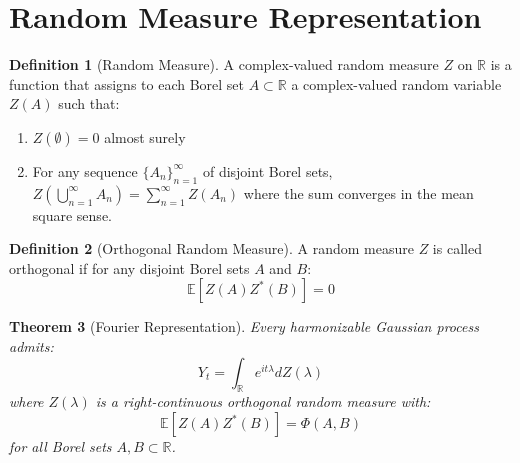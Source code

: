 \documentclass{article}
\theoremstyle{plain}
\newtheorem{theorem}{Theorem}
\theoremstyle{definition}
\newtheorem{definition}[theorem]{Definition}
\begin{document}
\section{Random Measure Representation}

\begin{definition}[Random Measure]
A complex-valued random measure $Z$ on $\mathbb{R}$ is a function that assigns to each Borel set $A \subset \mathbb{R}$ a complex-valued random variable $Z(A)$ such that:
\begin{enumerate}
\item $Z(\emptyset) = 0$ almost surely
\item For any sequence $\{A_n\}_{n=1}^{\infty}$ of disjoint Borel sets, $Z\left(\bigcup_{n=1}^{\infty} A_n\right) = \sum_{n=1}^{\infty} Z(A_n)$ where the sum converges in the mean square sense.
\end{enumerate}
\end{definition}

\begin{definition}[Orthogonal Random Measure]
A random measure $Z$ is called orthogonal if for any disjoint Borel sets $A$ and $B$:
\begin{equation}
\mathbb{E}[Z(A)Z^*(B)] = 0
\end{equation}
\end{definition}

\begin{theorem}[Fourier Representation]
Every harmonizable Gaussian process admits:
\begin{equation}
Y_t = \int_{\mathbb{R}} e^{it\lambda} dZ(\lambda)
\end{equation}
where $Z(\lambda)$ is a right-continuous orthogonal random measure with:
\begin{equation}
\mathbb{E}[Z(A)Z^*(B)] = \Phi(A,B)
\end{equation}
for all Borel sets $A, B \subset \mathbb{R}$.
\end{theorem}
\end{document}
